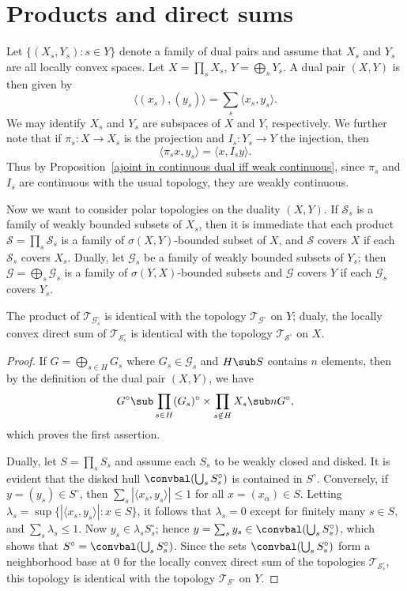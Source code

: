 \section{Products and direct sums}
Let $\{(X_s,Y_s):s\in Y\}$ denote a family of dual pairs and assume that $X_s$ and $Y_s$ are all locally convex spaces. Let $X=\prod_sX_s$, $Y=\bigoplus_sY_s$. A dual pair $(X,Y)$ is then given by
\[\langle(x_s),(y_s)\rangle=\sum_s\langle x_s,y_s\rangle.\]
We may identify $X_s$ and $Y_s$ are subspaces of $X$ and $Y$, respectively. We further note that if $\pi_s:X\to X_s$ is the projection and $I_s:Y_s\to Y$ the injection, then
\[\langle \pi_sx,y_s\rangle=\langle x,I_sy\rangle.\]
Thus by Proposition~\ref{ajoint in continuous dual iff weak continuous}, since $\pi_s$ and $I_s$ are continuous with the usual topology, they are weakly continuous.\par
Now we want to consider polar topologies on the duality $(X,Y)$. If $\mathcal{S}_s$ is a family of weakly bounded subsets of $X_s$, then it is immediate that each product $\mathcal{S}=\prod_s\mathcal{S}_s$ is a family of $\sigma(X,Y)$-bounded subset of $X$, and $\mathcal{S}$ covers $X$ if each $\mathcal{S}_s$ covers $X_s$. Dually, let $\mathcal{G}_s$ be a family of weakly bounded subsets of $Y_s$; then $\mathcal{G}=\bigoplus_s\mathcal{G}_s$ is a family of $\sigma(Y,X)$-bounded subsets and $\mathcal{G}$ covers $Y$ if each $\mathcal{G}_s$ covers $Y_s$.
\begin{proposition}\label{polar topo for product and direct sum}
The product of $\mathcal{T}_{\mathcal{G}_s^\circ}$ is identical with the topology $\mathcal{T}_{\mathcal{G}^\circ}$ on $Y$; dualy, the locally convex direct sum of $\mathcal{T}_{\mathcal{S}_s^\circ}$ is identical with the topology $\mathcal{T}_{\mathcal{S}^\circ}$ on $X$.
\end{proposition}
\begin{proof}
If $G=\bigoplus_{s\in H}G_{s}$ where $G_{s}\in\mathcal{G}_{s}$ and $H\sub S$ contains $n$ elements, then by the definition of the dual pair $(X,Y)$, we have
\[G^\circ\sub\prod_{s\in H}(G_{s})^\circ\times\prod_{s\notin H}X_s\sub nG^\circ,\]
which proves the first assertion.\par
Dually, let $S=\prod_sS_s$ and assume each $S_s$ to be weakly closed and disked. It is evident that the disked hull $\convbal(\bigcup_sS_s^\circ)$ is contained in $S^\circ$. Conversely, if $y=(y_s)\in S^\circ$, then $\sum_s|\langle x_s,y_s\rangle|\leq 1$ for all $x=(x_\alpha)\in S$. Letting $\lambda_s=\sup\{|\langle x_s,y_s\rangle|:x\in S\}$, it follows that $\lambda_s=0$ except for finitely many $s\in S$, and $\sum_s\lambda_s\leq 1$. Now $y_s\in \lambda_sS_s^\circ$; hence $y=\sum_sy_s\in\convbal(\bigcup_sS_s^\circ)$, which shows that $S^\circ=\convbal(\bigcup_sS_s^\circ)$. Since the sets $\convbal(\bigcup_sS_s^\circ)$ form a neighborhood base at $0$ for the locally convex direct sum of the topologies $\mathcal{T}_{\mathcal{S}_s^\circ}$, this topology is identical with the topology $\mathcal{T}_{\mathcal{S}^\circ}$ on $Y$.
\end{proof}
